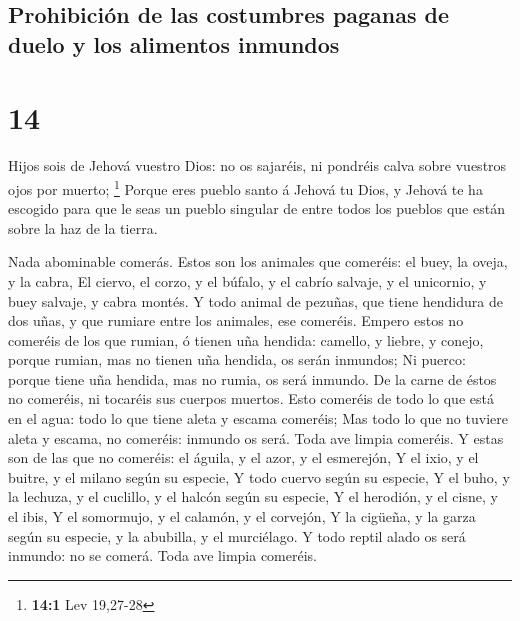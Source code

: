 \hypertarget{prohibiciuxf3n-de-las-costumbres-paganas-de-duelo-y-los-alimentos-inmundos}{%
\subsection{Prohibición de las costumbres paganas de duelo y los
alimentos
inmundos}\label{prohibiciuxf3n-de-las-costumbres-paganas-de-duelo-y-los-alimentos-inmundos}}

\hypertarget{section-13}{%
\section{14}\label{section-13}}

 Hijos sois de Jehová vuestro Dios: no os sajaréis, ni
pondréis calva sobre vuestros ojos por muerto; \footnote{\textbf{14:1}
  Lev 19,27-28}  Porque eres pueblo santo á Jehová tu Dios,
y Jehová te ha escogido para que le seas un pueblo singular de entre
todos los pueblos que están sobre la haz de la tierra.

 Nada abominable comerás.  Estos son los
animales que comeréis: el buey, la oveja, y la cabra,  El
ciervo, el corzo, y el búfalo, y el cabrío salvaje, y el unicornio, y
buey salvaje, y cabra montés.  Y todo animal de pezuñas, que
tiene hendidura de dos uñas, y que rumiare entre los animales, ese
comeréis.  Empero estos no comeréis de los que rumian, ó
tienen uña hendida: camello, y liebre, y conejo, porque rumian, mas no
tienen uña hendida, os serán inmundos;  Ni puerco: porque
tiene uña hendida, mas no rumia, os será inmundo. De la carne de éstos
no comeréis, ni tocaréis sus cuerpos muertos.  Esto comeréis
de todo lo que está en el agua: todo lo que tiene aleta y escama
comeréis;  Mas todo lo que no tuviere aleta y escama, no
comeréis: inmundo os será.  Toda ave limpia comeréis.
 Y estas son de las que no comeréis: el águila, y el azor,
y el esmerejón,  Y el ixio, y el buitre, y el milano según
su especie,  Y todo cuervo según su especie, 
Y el buho, y la lechuza, y el cuclillo, y el halcón según su especie,
 Y el herodión, y el cisne, y el ibis,  Y el
somormujo, y el calamón, y el corvejón,  Y la cigüeña, y la
garza según su especie, y la abubilla, y el murciélago.  Y
todo reptil alado os será inmundo: no se comerá.  Toda ave
limpia comeréis.

